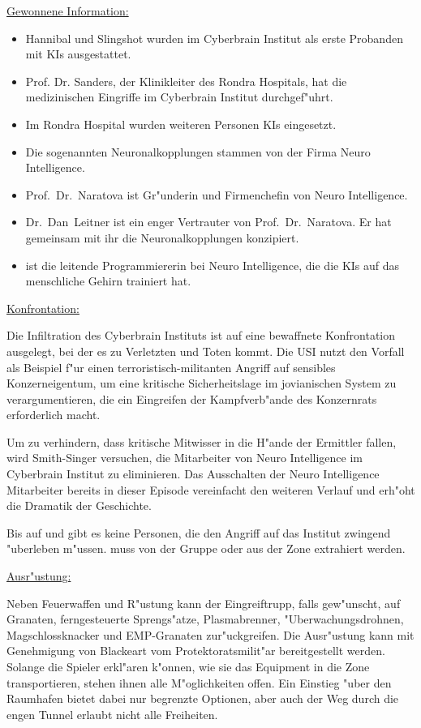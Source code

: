 \begin{remarks}
	\underline{Gewonnene Information:}
	
	\begin{itemize}
		\item Hannibal und Slingshot wurden im Cyberbrain Institut als erste Probanden mit KIs ausgestattet.
		\item Prof. Dr. Sanders, der Klinikleiter des Rondra Hospitals, hat die medizinischen Eingriffe im Cyberbrain Institut 
			durchgef"uhrt.
		\item Im Rondra Hospital wurden weiteren Personen KIs eingesetzt.
		\item Die sogenannten Neuronalkopplungen stammen von der Firma Neuro Intelligence.
		\item Prof.~Dr.~Naratova ist Gr"underin und Firmenchefin von Neuro Intelligence.
		\item Dr.~Dan~Leitner ist ein enger Vertrauter von Prof.~Dr.~Naratova. Er hat gemeinsam mit ihr die Neuronalkopplungen konzipiert.
		\item \ml{} ist die leitende Programmiererin bei Neuro Intelligence, die die KIs auf das menschliche Gehirn trainiert hat.
	\end{itemize}	 

	\underline{Konfrontation:}

	Die Infiltration des Cyberbrain Instituts ist auf eine bewaffnete Konfrontation ausgelegt, bei der es zu Verletzten und Toten kommt. Die USI nutzt den Vorfall als Beispiel f"ur einen terroristisch-militanten Angriff auf sensibles Konzerneigentum, um eine kritische Sicherheitslage im jovianischen System zu verargumentieren, die ein Eingreifen der Kampfverb"ande des Konzernrats erforderlich macht.

	Um zu verhindern, dass kritische Mitwisser in die H"ande der Ermittler fallen, wird Smith-Singer versuchen, die Mitarbeiter von Neuro Intelligence im Cyberbrain Institut zu eliminieren. Das Ausschalten der Neuro Intelligence Mitarbeiter bereits in dieser Episode vereinfacht den weiteren Verlauf und erh"oht die Dramatik der Geschichte.
	
	Bis auf \ml{} und \xl{} gibt es keine Personen, die den Angriff auf das Institut zwingend "uberleben m"ussen. \ml{} muss von der Gruppe oder \xl{} aus der Zone extrahiert werden.

	\underline{Ausr"ustung:}

	Neben Feuerwaffen und R"ustung kann der Eingreiftrupp, falls gew"unscht, auf Granaten, ferngesteuerte Sprengs"atze, Plasmabrenner, "Uberwachungsdrohnen, Magschlossknacker und EMP-Granaten zur"uckgreifen. Die Ausr"ustung kann mit Genehmigung von Blackeart vom Protektoratsmilit"ar bereitgestellt werden. Solange die Spieler erkl"aren k"onnen, wie sie das Equipment in die Zone transportieren, stehen ihnen alle M"oglichkeiten offen. Ein Einstieg "uber den Raumhafen bietet dabei nur begrenzte Optionen, aber auch der Weg durch die engen Tunnel erlaubt nicht alle Freiheiten.
\end{remarks}

